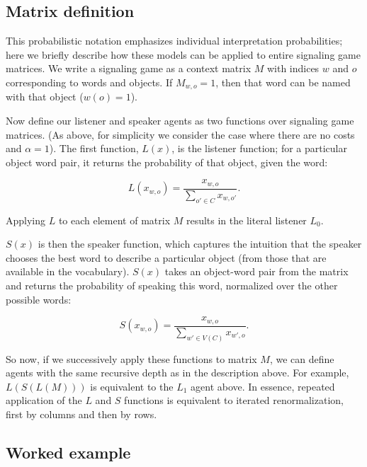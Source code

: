 \documentclass[man,noapacite]{apa2}
\begin{document}
\subsection{Matrix definition}

This probabilistic notation emphasizes individual interpretation probabilities; here we briefly describe how these models can be applied to entire signaling game matrices. We write a signaling game as a context matrix $M$ with indices $w$ and $o$ corresponding to words and objects. If $M_{w,o} = 1$, then that word can be named with that object ($w(o) = 1$).

Now define our listener and speaker agents as two functions over signaling game matrices. (As above, for simplicity we consider the case where there are no costs and $\alpha=1$). The first function, $L(x)$, is the listener function; for a particular object word pair, it returns the probability of that object, given the word:

\begin{equation}
  \label{eq:lmatrix}
L(x_{w,o}) = \frac{x_{w,o}}{\displaystyle\sum_{o' \in C} x_{w,o'} }.
\end{equation}

\noindent Applying $L$ to each element of matrix $M$ results in the literal listener $L_0$.

$S(x)$ is then the speaker function, which captures the intuition that the speaker chooses the best word to describe a particular object (from those that are available in the vocabulary). $S(x)$ takes an object-word pair from the matrix and returns the probability of speaking this word, normalized over the other possible words:

\begin{equation}
  \label{eq:smatrix}
S(x_{w,o}) = \frac{x_{w,o}}{\displaystyle \sum_{w' \in V(C)} x_{w',o}}.
\end{equation}

So now, if we successively apply these functions to matrix $M$, we can define agents with the same recursive depth as in the description above. For example, $L(S(L(M)))$ is equivalent to the $L_1$ agent above. In essence, repeated application of the $L$ and $S$ functions is equivalent to iterated renormalization, first by columns and then by rows.

\subsection{Worked example}
\end{document}
